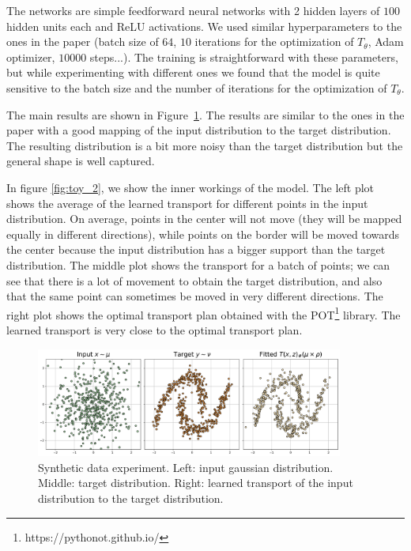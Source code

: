 \documentclass[11pt]{article}
\begin{document}
The networks are simple feedforward neural networks with 2 hidden layers of $100$ hidden units each and ReLU activations. We used similar hyperparameters to the ones in the paper (batch size of $64$, $10$ iterations for the optimization of $T_\theta$, Adam optimizer, $10000$ steps...). The training is straightforward with these parameters, but while experimenting with different ones we found that the model is quite sensitive to the batch size and the number of iterations for the optimization of $T_\theta$.

The main results are shown in Figure~\ref{fig:toy_1}. The results are similar to the ones in the paper with a good mapping of the input distribution to the target distribution. The resulting distribution is a bit more noisy than the target distribution but the general shape is well captured.

In figure \ref{fig:toy_2}, we show the inner workings of the model. The left plot shows the average of the learned transport for different points in the input distribution. On average, points in the center will not move (they will be mapped equally in different directions), while points on the border will be moved towards the center because the input distribution has a bigger support than the target distribution. The middle plot shows the transport for a batch of points; we can see that there is a lot of movement to obtain the target distribution, and also that the same point can sometimes be moved in very different directions. The right plot shows the optimal transport plan obtained with the POT\footnote{https://pythonot.github.io/} library. The learned transport is very close to the optimal transport plan.

\begin{figure}[H]
    \centering
    \includegraphics[width=0.9\textwidth]{figures/toy_1.png}
    \caption{Synthetic data experiment. Left: input gaussian distribution. Middle: target distribution. Right: learned transport of the input distribution to the target distribution.}
    \label{fig:toy_1}
\end{figure}
\end{document}
